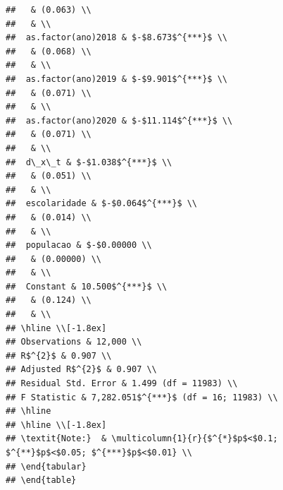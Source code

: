 \documentclass[
]{article}
\begin{document}
\begin{verbatim}
##   & (0.063) \\ 
##   & \\ 
##  as.factor(ano)2018 & $-$8.673$^{***}$ \\ 
##   & (0.068) \\ 
##   & \\ 
##  as.factor(ano)2019 & $-$9.901$^{***}$ \\ 
##   & (0.071) \\ 
##   & \\ 
##  as.factor(ano)2020 & $-$11.114$^{***}$ \\ 
##   & (0.071) \\ 
##   & \\ 
##  d\_x\_t & $-$1.038$^{***}$ \\ 
##   & (0.051) \\ 
##   & \\ 
##  escolaridade & $-$0.064$^{***}$ \\ 
##   & (0.014) \\ 
##   & \\ 
##  populacao & $-$0.00000 \\ 
##   & (0.00000) \\ 
##   & \\ 
##  Constant & 10.500$^{***}$ \\ 
##   & (0.124) \\ 
##   & \\ 
## \hline \\[-1.8ex] 
## Observations & 12,000 \\ 
## R$^{2}$ & 0.907 \\ 
## Adjusted R$^{2}$ & 0.907 \\ 
## Residual Std. Error & 1.499 (df = 11983) \\ 
## F Statistic & 7,282.051$^{***}$ (df = 16; 11983) \\ 
## \hline 
## \hline \\[-1.8ex] 
## \textit{Note:}  & \multicolumn{1}{r}{$^{*}$p$<$0.1; $^{**}$p$<$0.05; $^{***}$p$<$0.01} \\ 
## \end{tabular} 
## \end{table}
\end{verbatim}
\end{document}
